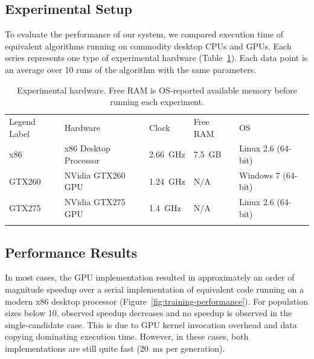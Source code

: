 \documentclass[letterpaper]{jpconf}       %
\begin{document}
\subsection{Experimental Setup} \label{experiment}
To evaluate the performance of our system, we compared execution time of equivalent algorithms running on commodity desktop CPUs and GPUs. Each series represents one type of experimental hardware (Table~\ref{tab:experimental-hardware}). Each data point is an average over 10 runs of the algorithm with the same parameters.

\begin{table}[h]
	\caption{\label{tab:experimental-hardware}Experimental hardware. Free RAM is OS-reported available memory before running each experiment.}
	\begin{center}
	\begin{tabular}{lllll}
	\br
	Legend Label&Hardware&Clock&Free RAM&OS\\
	\mr
	x86   &x86 Desktop Processor&2.66~GHz&7.5~GB&Linux 2.6 (64-bit) \\
	GTX260&NVidia GTX260 GPU    &1.24~GHz&N/A   &Windows 7 (64-bit) \\
	GTX275&NVidia GTX275 GPU    &1.4~GHz &N/A   &Linux 2.6 (64-bit) \\
	\br
	\end{tabular}
	\end{center}
\end{table}

\subsection{Performance Results} \label{performance}
In most cases, the GPU implementation resulted in approximately an order of magnitude speedup over a serial implementation of equivalent code running on a modern x86 desktop processor (Figure~\ref{fig:training-performance}). For population sizes below 10, observed speedup decreases and no speedup is observed in the single-candidate case. This is due to GPU kernel invocation overhead and data copying dominating execution time. However, in these cases, both implementations are still quite fast (20~ms per generation).
\end{document}
